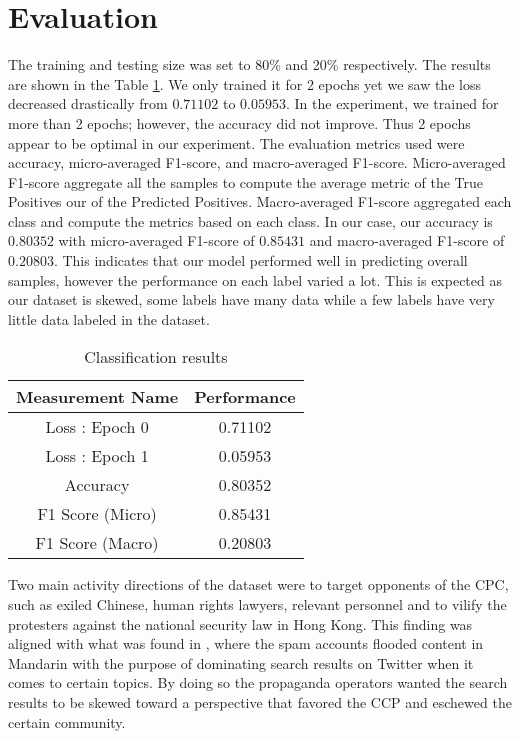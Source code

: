 \documentclass[sigconf]{acmart}
\begin{document}
\section{Evaluation}
The training and testing size was set to 80\% and 20\% respectively. The results are shown in the Table \ref{tab:res}. We only trained it for 2 epochs yet we saw the loss decreased drastically from $ 0.71102$ to $ 0.05953$. In the experiment, we trained for more than 2 epochs; however, the accuracy did not improve. Thus 2 epochs appear to be optimal in our experiment. The evaluation metrics used were accuracy, micro-averaged F1-score, and macro-averaged F1-score. Micro-averaged F1-score aggregate all the samples to compute the average metric of the True Positives our of the Predicted Positives. Macro-averaged F1-score aggregated each class and compute the metrics based on each class. In our case, our accuracy is $ 0.80352$ with micro-averaged F1-score of $ 0.85431$ and macro-averaged F1-score of $ 0.20803$. This indicates that our model performed well in predicting overall samples, however the performance on each label varied a lot. This is expected as our dataset is skewed, some labels have many data while a few labels have very little data labeled in the dataset. 

\begin{table}[ht]
  \caption{Classification results}
  \label{tab:res}
  \begin{tabular}{cc}
    \toprule
    Measurement Name & Performance \\
    \midrule
    Loss : Epoch 0 & 0.71102 \\
    Loss : Epoch 1 & 0.05953 \\
    Accuracy& 0.80352 \\
    F1 Score (Micro) & 0.85431 \\
    F1 Score (Macro) & 0.20803 \\
  \bottomrule
\end{tabular}
\end{table}



Two main activity directions of the dataset were to target opponents of the CPC, such as exiled Chinese, human rights lawyers, relevant personnel and to vilify the protesters against the national security law in Hong Kong. This finding was aligned with what was found in \cite{uren2019tweeting} \cite{bolsover2017computational}, where the spam accounts flooded content in Mandarin with the purpose of dominating search results on Twitter when it comes to certain topics. By doing so the propaganda operators wanted the search results to be skewed toward a perspective that favored the CCP and eschewed the certain community.
\end{document}
